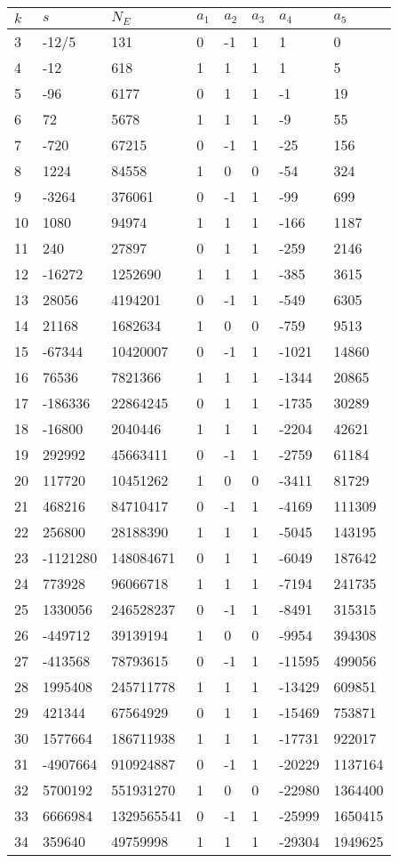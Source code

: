 \documentclass{amsart}
\begin{document}
\begin{longtable}{|l|l|l|lllll|}
\hline
$k$ & $s$ & $N_E$ & $a_1$ & $a_2$ & $a_3$ & $a_4$ & $a_5$\\
\hline
3&-12/5&131&0&-1&1&1&0\\
4&-12&618&1&1&1&1&5\\
5&-96&6177&0&1&1&-1&19\\
6&72&5678&1&1&1&-9&55\\
7&-720&67215&0&-1&1&-25&156\\
8&1224&84558&1&0&0&-54&324\\
9&-3264&376061&0&-1&1&-99&699\\
10&1080&94974&1&1&1&-166&1187\\
11&240&27897&0&1&1&-259&2146\\
12&-16272&1252690&1&1&1&-385&3615\\
13&28056&4194201&0&-1&1&-549&6305\\
14&21168&1682634&1&0&0&-759&9513\\
15&-67344&10420007&0&-1&1&-1021&14860\\
16&76536&7821366&1&1&1&-1344&20865\\
17&-186336&22864245&0&1&1&-1735&30289\\
18&-16800&2040446&1&1&1&-2204&42621\\
19&292992&45663411&0&-1&1&-2759&61184\\
20&117720&10451262&1&0&0&-3411&81729\\
21&468216&84710417&0&-1&1&-4169&111309\\
22&256800&28188390&1&1&1&-5045&143195\\
23&-1121280&148084671&0&1&1&-6049&187642\\
24&773928&96066718&1&1&1&-7194&241735\\
25&1330056&246528237&0&-1&1&-8491&315315\\
26&-449712&39139194&1&0&0&-9954&394308\\
27&-413568&78793615&0&-1&1&-11595&499056\\
28&1995408&245711778&1&1&1&-13429&609851\\
29&421344&67564929&0&1&1&-15469&753871\\
30&1577664&186711938&1&1&1&-17731&922017\\
31&-4907664&910924887&0&-1&1&-20229&1137164\\
32&5700192&551931270&1&0&0&-22980&1364400\\
33&6666984&1329565541&0&-1&1&-25999&1650415\\
34&359640&49759998&1&1&1&-29304&1949625\\

\end{longtable}
\end{document}
